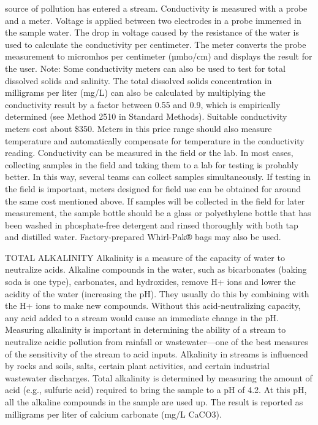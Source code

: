 \documentclass{article}
\begin{document}
source of pollution has entered a stream. Conductivity is measured with
a probe and a meter. Voltage is applied between two electrodes in a
probe immersed in the sample water. The drop in voltage caused by the
resistance of the water is used to calculate the conductivity per
centimeter. The meter converts the probe measurement to micromhos per
centimeter (µmho/cm) and displays the result for the user. Note: Some
conductivity meters can also be used to test for total dissolved solids
and salinity. The total dissolved solids concentration in milligrams per
liter (mg/L) can also be calculated by multiplying the conductivity
result by a factor between 0.55 and 0.9, which is empirically determined
(see Method 2510 in Standard Methods). Suitable conductivity meters cost
about \$350. Meters in this price range should also measure temperature
and automatically compensate for temperature in the conductivity
reading. Conductivity can be measured in the field or the lab. In most
cases, collecting samples in the field and taking them to a lab for
testing is probably better. In this way, several teams can collect
samples simultaneously. If testing in the field is important, meters
designed for field use can be obtained for around the same cost
mentioned above. If samples will be collected in the field for later
measurement, the sample bottle should be a glass or polyethylene bottle
that has been washed in phosphate-free detergent and rinsed thoroughly
with both tap and distilled water. Factory-prepared Whirl-Pak® bags may
also be used.

TOTAL ALKALINITY Alkalinity is a measure of the capacity of water to
neutralize acids. Alkaline compounds in the water, such as bicarbonates
(baking soda is one type), carbonates, and hydroxides, remove H+ ions
and lower the acidity of the water (increasing the pH). They usually do
this by combining with the H+ ions to make new compounds. Without this
acid-neutralizing capacity, any acid added to a stream would cause an
immediate change in the pH. Measuring alkalinity is important in
determining the ability of a stream to neutralize acidic pollution from
rainfall or wastewater---one of the best measures of the sensitivity of
the stream to acid inputs. Alkalinity in streams is influenced by rocks
and soils, salts, certain plant activities, and certain industrial
wastewater discharges. Total alkalinity is determined by measuring the
amount of acid (e.g., sulfuric acid) required to bring the sample to a
pH of 4.2. At this pH, all the alkaline compounds in the sample are used
up. The result is reported as milligrams per liter of calcium carbonate
(mg/L CaCO3).
\end{document}

